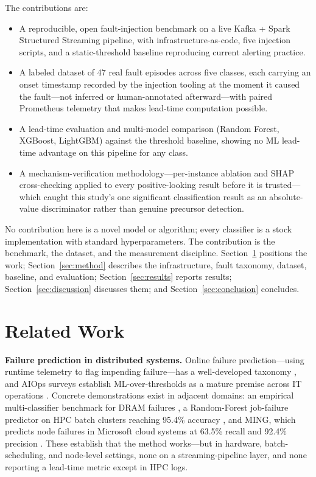\documentclass[conference]{IEEEtran}
\begin{document}
The contributions are:
\begin{itemize}
\item A reproducible, open fault-injection benchmark on a live Kafka + Spark Structured Streaming pipeline, with infrastructure-as-code, five injection scripts, and a static-threshold baseline reproducing current alerting practice.
\item A labeled dataset of 47 real fault episodes across five classes, each carrying an onset timestamp recorded by the injection tooling at the moment it caused the fault---not inferred or human-annotated afterward---with paired Prometheus telemetry that makes lead-time computation possible.
\item A lead-time evaluation and multi-model comparison (Random Forest, XGBoost, LightGBM) against the threshold baseline, showing no ML lead-time advantage on this pipeline for any class.
\item A mechanism-verification methodology---per-instance ablation and SHAP cross-checking applied to every positive-looking result before it is trusted---which caught this study's one significant classification result as an absolute-value discriminator rather than genuine precursor detection.
\end{itemize}

No contribution here is a novel model or algorithm; every classifier is a stock implementation with standard hyperparameters. The contribution is the benchmark, the dataset, and the measurement discipline. Section~\ref{sec:related} positions the work; Section~\ref{sec:method} describes the infrastructure, fault taxonomy, dataset, baseline, and evaluation; Section~\ref{sec:results} reports results; Section~\ref{sec:discussion} discusses them; and Section~\ref{sec:conclusion} concludes.

\section{Related Work}\label{sec:related}
\textbf{Failure prediction in distributed systems.} Online failure prediction---using runtime telemetry to flag impending failure---has a well-developed taxonomy \cite{salfner2010}, and AIOps surveys establish ML-over-thresholds as a mature premise across IT operations \cite{notaro2021,zhang2024}. Concrete demonstrations exist in adjacent domains: an empirical multi-classifier benchmark for DRAM failures \cite{wu2021}, a Random-Forest job-failure predictor on HPC batch clusters reaching 95.4\% accuracy \cite{harrison2018}, and MING, which predicts node failures in Microsoft cloud systems at 63.5\% recall and 92.4\% precision \cite{lin2018}. These establish that the method works---but in hardware, batch-scheduling, and node-level settings, none on a streaming-pipeline layer, and none reporting a lead-time metric except in HPC logs.
\end{document}
